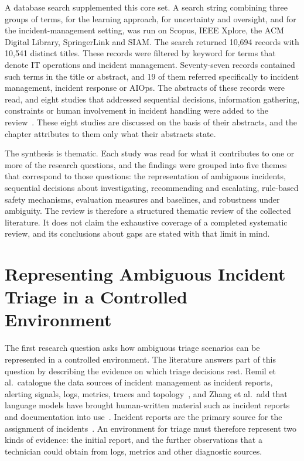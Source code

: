\documentclass[12pt,a4paper]{article}
\begin{document}
A database search supplemented this core set. A search string combining three groups of terms, for the learning approach, for uncertainty and oversight, and for the incident-management setting, was run on Scopus, IEEE Xplore, the ACM Digital Library, SpringerLink and SIAM. The search returned 10,694 records with 10,541 distinct titles. These records were filtered by keyword for terms that denote IT operations and incident management. Seventy-seven records contained such terms in the title or abstract, and 19 of them referred specifically to incident management, incident response or AIOps. The abstracts of these records were read, and eight studies that addressed sequential decisions, information gathering, constraints or human involvement in incident handling were added to the review~\cite{alauthman2026,hammar2025,hammar2026llm,hammar2026belief,kim2025,dantonio2025,wang2023hrlhf,ding2023}. These eight studies are discussed on the basis of their abstracts, and the chapter attributes to them only what their abstracts state.

The synthesis is thematic. Each study was read for what it contributes to one or more of the research questions, and the findings were grouped into five themes that correspond to those questions: the representation of ambiguous incidents, sequential decisions about investigating, recommending and escalating, rule-based safety mechanisms, evaluation measures and baselines, and robustness under ambiguity. The review is therefore a structured thematic review of the collected literature. It does not claim the exhaustive coverage of a completed systematic review, and its conclusions about gaps are stated with that limit in mind.

\section{Representing Ambiguous Incident Triage in a Controlled Environment}

The first research question asks how ambiguous triage scenarios can be represented in a controlled environment. The literature answers part of this question by describing the evidence on which triage decisions rest. Remil et al.\ catalogue the data sources of incident management as incident reports, alerting signals, logs, metrics, traces and topology~\cite{remil2024}, and Zhang et al.\ add that language models have brought human-written material such as incident reports and documentation into use~\cite{zhang2025}. Incident reports are the primary source for the assignment of incidents~\cite{remil2024}. An environment for triage must therefore represent two kinds of evidence: the initial report, and the further observations that a technician could obtain from logs, metrics and other diagnostic sources.
\end{document}
